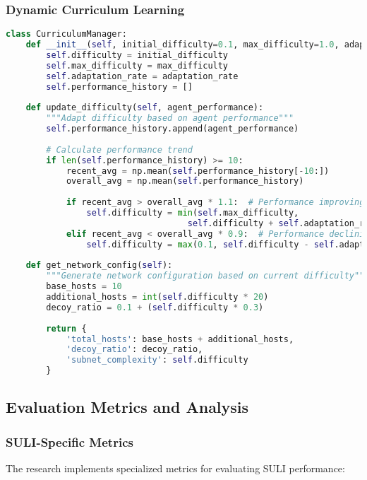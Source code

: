 \documentclass[12pt,a4paper]{article}
\begin{document}
\subsubsection{Dynamic Curriculum Learning}
\begin{lstlisting}[language=Python, caption=Curriculum Learning Implementation]
class CurriculumManager:
    def __init__(self, initial_difficulty=0.1, max_difficulty=1.0, adaptation_rate=0.01):
        self.difficulty = initial_difficulty
        self.max_difficulty = max_difficulty
        self.adaptation_rate = adaptation_rate
        self.performance_history = []
    
    def update_difficulty(self, agent_performance):
        """Adapt difficulty based on agent performance"""
        self.performance_history.append(agent_performance)
        
        # Calculate performance trend
        if len(self.performance_history) >= 10:
            recent_avg = np.mean(self.performance_history[-10:])
            overall_avg = np.mean(self.performance_history)
            
            if recent_avg > overall_avg * 1.1:  # Performance improving
                self.difficulty = min(self.max_difficulty, 
                                    self.difficulty + self.adaptation_rate)
            elif recent_avg < overall_avg * 0.9:  # Performance declining
                self.difficulty = max(0.1, self.difficulty - self.adaptation_rate)
    
    def get_network_config(self):
        """Generate network configuration based on current difficulty"""
        base_hosts = 10
        additional_hosts = int(self.difficulty * 20)
        decoy_ratio = 0.1 + (self.difficulty * 0.3)
        
        return {
            'total_hosts': base_hosts + additional_hosts,
            'decoy_ratio': decoy_ratio,
            'subnet_complexity': self.difficulty
        }
\end{lstlisting}

\subsection{Evaluation Metrics and Analysis}

\subsubsection{SULI-Specific Metrics}
The research implements specialized metrics for evaluating SULI performance:
\end{document}
